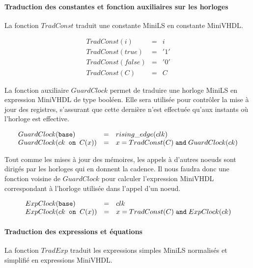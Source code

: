 \documentclass[a4paper]{article}
\newcommand{\mybox}[1]{\mbox{\tt{#1}}}
\newcommand{\Base}[0]{\mybox{base}}
\newcommand{\On}[3]{#1 \mybox{ on } #2 (#3)}
\begin{document}
\paragraph{Traduction des constantes et fonction auxiliaires sur les horloges}

La fonction $TradConst$ traduit une constante MiniLS en constante MiniVHDL.

\newcommand{\TradC}[1]{TradConst(#1)}

\[
\begin{array}{lcl}
  \TradC{i} & = & i \\
  \TradC{true} & = & '1' \\
  \TradC{false} & = & '0' \\
  \TradC{C} & = & C
\end{array}
\]

La fonction auxiliaire $GuardClock$ permet de traduire une horloge MiniLS en
expression MiniVHDL de type bool\'een. Elle sera utilis\'ee pour contr\^oler la mise \`a
jour des registres, s'assurant que cette derni\`ere n'est effectu\'ee qu'aux
instants o\`u l'horloge est effective.

\newcommand{\GEC}[1]{GuardClock(#1)}

\[
\begin{array}{lcl}
  \GEC{\Base} & = & rising\_edge(clk) \\
  \GEC{\On{ck}{C}{x}} & = & x = \TradC{C} \; \mathtt{and} \; \GEC{ck}
\end{array}
\]

Tout comme les mises \`a jour des m\'emoires, les appels \`a d'autres noeuds sont
dirig\'es par les horloges qui en donnent la cadence. Il nous faudra donc une
fonction voisine de $GuardClock$ pour calculer l'expression MiniVHDL
correspondant \`a l'horloge utilis\'ee dans l'appel d'un noeud.

\newcommand{\EC}[1]{ExpClock(#1)}

\[
\begin{array}{lcl}
  \EC{\Base} & = & clk \\
  \EC{\On{ck}{C}{x}} & = & x = \TradC{C} \; \mathtt{and} \; \EC{ck}
\end{array}
\]

\paragraph{Traduction des expressions et \'equations}

La fonction $TradExp$ traduit les expressions simples MiniLS normalis\'es et
simplifi\'e en expressions MiniVHDL.
\end{document}
